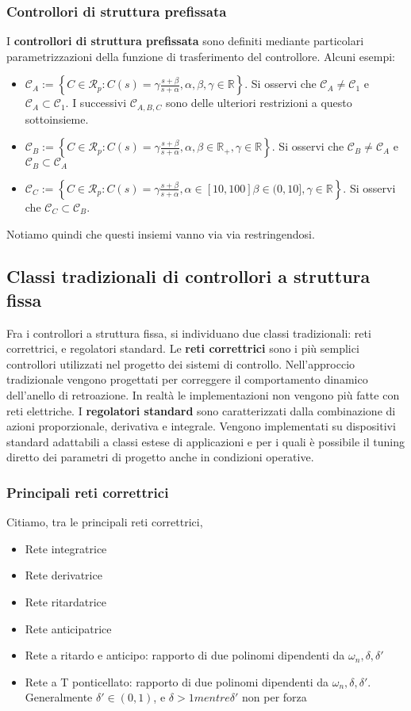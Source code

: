 \documentclass[11pt]{article}
\begin{document}
\subsubsection{Controllori di struttura prefissata}
I \textbf{controllori di struttura prefissata} sono definiti mediante particolari parametrizzazioni della funzione di trasferimento del controllore. Alcuni esempi:
\begin{itemize}
    \item $\mathcal{C}_A := \left\{C\in\mathcal{R}_p:C(s)=\gamma \frac{s+\beta}{s+\alpha}, \alpha, \beta, \gamma \in \mathbb{R}\right\}$. Si osservi che $\mathcal{C}_A \neq \mathcal{C}_1$ e $\mathcal{C}_A \subset \mathcal{C}_1$. I successivi $\mathcal{C}_{A,B,C}$ sono delle ulteriori restrizioni a questo sottoinsieme.
    \item $\mathcal{C}_B := \left\{C\in\mathcal{R}_p:C(s)=\gamma \frac{s+\beta}{s+\alpha}, \alpha, \beta \in \mathbb{R}_+,\gamma \in \mathbb{R} \right\}$. Si osservi che $\mathcal{C}_B \neq \mathcal{C}_A$ e $\mathcal{C}_B \subset \mathcal{C}_A$
    \item $\mathcal{C}_C := \left\{C\in\mathcal{R}_p:C(s)=\gamma \frac{s+\beta}{s+\alpha}, \alpha \in [10,100] \beta \in (0,10],\gamma \in \mathbb{R} \right\}$. Si osservi che $\mathcal{C}_C \subset \mathcal{C}_B$.
\end{itemize}
Notiamo quindi che questi insiemi vanno via via restringendosi.
\subsection{Classi tradizionali di controllori a struttura fissa}
Fra i controllori a struttura fissa, si individuano due classi tradizionali: reti correttrici, e regolatori standard. Le \textbf{reti correttrici} sono i più semplici controllori utilizzati nel progetto dei sistemi di controllo. Nell'approccio tradizionale vengono progettati per correggere il comportamento dinamico dell'anello di retroazione. In realtà le implementazioni non vengono più fatte con reti elettriche. I \textbf{regolatori standard} sono caratterizzati dalla combinazione di azioni proporzionale, derivativa e integrale. Vengono implementati su dispositivi standard adattabili a classi estese di applicazioni e per i quali è possibile il tuning diretto dei parametri di progetto anche in condizioni operative.
\subsubsection{Principali reti correttrici}
Citiamo, tra le principali reti correttrici,
\begin{itemize}
    \item Rete integratrice
    \item Rete derivatrice
    \item Rete ritardatrice
    \item Rete anticipatrice
    \item Rete a ritardo e anticipo: rapporto di due polinomi dipendenti da $\omega_n, \delta, \delta'$
    \item Rete a T ponticellato: rapporto di due polinomi dipendenti da $\omega_n, \delta, \delta'$. Generalmente $\delta'\in (0,1)$, e $\delta>1 mentre \delta'$ non per forza
\end{itemize}
\end{document}

